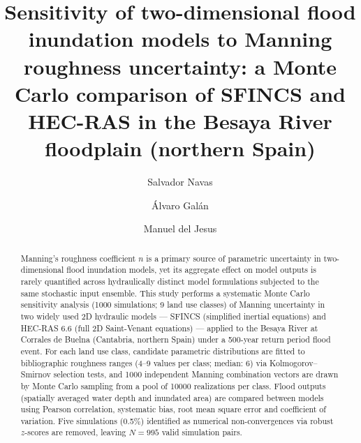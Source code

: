 \documentclass[review,12pt]{elsarticle}
\newcommand{\nman}{$n$}
\newcommand{\sfincs}{\textsc{SFINCS}}
\newcommand{\hecras}{\textsc{HEC-RAS}}
\begin{document}
\begin{frontmatter}

\title{Sensitivity of two-dimensional flood inundation models to Manning
roughness uncertainty: a Monte Carlo comparison of \sfincs{} and \hecras{}
in the Besaya River floodplain (northern Spain)}

\author[hl]{Salvador Navas}

\author[uclm]{\'Alvaro Gal\'an}

\author[uc]{Manuel del Jesus}


\address[hl]{HidraLab, Avda.\ Camilo Jos\'e Cela s/n, 13005 Ciudad Real, Spain}

\address[uclm]{Escuela T\'ecnica Superior de Ingenier\'ia de Caminos, Canales y Puertos,
Universidad de Castilla-La Mancha, Avda.\ Camilo Jos\'e Cela s/n,
13071 Ciudad Real, Spain}

\address[uc]{Escuela T\'ecnica Superior de Ingenieros de Caminos, Canales y Puertos,
Universidad de Cantabria, Avda.\ de los Castros s/n, 39005 Santander, Spain}

\begin{abstract}
Manning's roughness coefficient \nman{} is a primary source of parametric
uncertainty in two-dimensional flood inundation models, yet its aggregate
effect on model outputs is rarely quantified across hydraulically distinct
model formulations subjected to the same stochastic input ensemble.
This study performs a systematic Monte Carlo sensitivity analysis
(\num{1000} simulations; \num{9} land use classes) of Manning uncertainty
in two widely used 2D hydraulic models --- \sfincs{} (simplified inertial
equations) and \hecras{} 6.6 (full 2D Saint-Venant equations) --- applied to
the Besaya River at Corrales de Buelna (Cantabria, northern Spain) under
a 500-year return period flood event.
For each land use class, candidate parametric distributions are fitted to
bibliographic roughness ranges (4--9 values per class; median: 6) via
Kolmogorov--Smirnov selection tests, and \num{1000} independent Manning
combination vectors are drawn by Monte Carlo sampling from a pool of
\num{10000} realizations per class.
Flood outputs (spatially averaged water depth and inundated area) are compared
between models using Pearson correlation, systematic bias, root mean square
error and coefficient of variation.
Five simulations (0.5\%) identified as numerical non-convergences via
robust $z$-scores are removed, leaving $N = 995$ valid simulation pairs.


\end{abstract}
\end{frontmatter}
\end{document}
